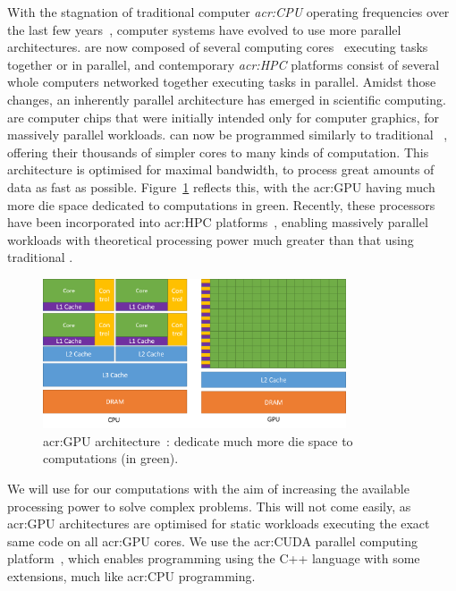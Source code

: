 With the stagnation of traditional computer \textit{\acrfull{acr:CPU}} operating frequencies over
the last few years~\cite{Parkhurst2006}, computer systems have evolved to use more parallel
architectures.  are now composed of several computing cores~\cite{Nayfeh1997}
executing tasks together or in parallel, and contemporary \textit{\acrfull{acr:HPC}} platforms
consist of several whole computers networked together executing tasks in parallel. Amidst those
changes, an inherently parallel architecture has emerged in scientific computing.
\textit{} are computer chips that were initially intended only for computer
graphics, for massively parallel workloads.  can now be programmed similarly to
traditional ~\cite{Owens2008}, offering their thousands of simpler cores to many
kinds of computation. This architecture is optimised for maximal bandwidth, to process great amounts
of data as fast as possible. Figure~\ref{fig:intro_gpu} reflects this, with the \acrshort{acr:GPU}
having much more die space dedicated to computations in green. Recently, these processors have been
incorporated into \acrshort{acr:HPC} platforms~\cite{Fan2004}, enabling massively parallel workloads
with theoretical processing power much greater than that using traditional .

\begin{figure}[H]
    \centering
    \includegraphics[width=0.8\textwidth]{Chapter_introduction/media/gpu-devotes-more-transistors-to-data-processing}
    \caption{\Acrshort{acr:GPU} architecture~\cite{Nvidia2021}:  dedicate much more die space to computations (in green).}\label{fig:intro_gpu}
\end{figure}

We will use  for our computations with the aim of increasing the available
processing power to solve complex problems. This will not come easily, as \acrshort{acr:GPU}
architectures are optimised for static workloads executing the exact same code on all
\acrshort{acr:GPU} cores. We use the \acrshort{acr:CUDA} parallel computing
platform~\cite{Garland2008}, which enables programming  using the C++ language
with some extensions, much like \acrshort{acr:CPU} programming.

